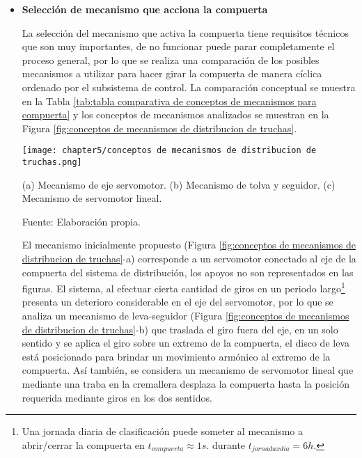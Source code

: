 \begin{itemize}
	
	\item \textbf{Selección de mecanismo que acciona la compuerta}
	
	La selección del mecanismo que activa la compuerta tiene requisitos técnicos que son muy importantes, de no funcionar puede parar completamente el proceso general, por lo que se realiza una comparación de los posibles mecanismos a utilizar para hacer girar la compuerta de manera cíclica ordenado por el subsistema de control. La comparación conceptual se muestra en la Tabla \ref{tab:tabla comparativa de conceptos de mecanismos para compuerta} y los conceptos de mecanismos analizados se muestran en la Figura \ref{fig:conceptos de mecanismos de distribucion de truchas}.
	
	\begin{myfigure}[H]
		\footnotesize\centering
		\texttt{[image: chapter5/conceptos de mecanismos de distribucion de truchas.png]}
		\caption[Conceptos de mecanismos de distribución de truchas]{(a) Mecanismo de eje servomotor. (b) Mecanismo de tolva y seguidor. (c) Mecanismo de servomotor lineal.}
		\begin{myflushcenter}
			Fuente: Elaboración propia.
		\end{myflushcenter}
		\label{fig:conceptos de mecanismos de distribucion de truchas}
	\end{myfigure}
	
	El mecanismo inicialmente propuesto (Figura \ref{fig:conceptos de mecanismos de distribucion de truchas}-a) corresponde a un servomotor conectado al eje de la compuerta del sistema de distribución, los apoyos no son representados en las figuras. El sistema, al efectuar cierta cantidad de giros en un periodo largo\footnote{Una jornada diaria de clasificación puede someter al mecanismo a abrir/cerrar la compuerta en $t_{compuerta}\approx1 s.$ durante $t_{jornadaxdia}=6 h.$} presenta un deterioro considerable en el eje del servomotor, por lo que se analiza un mecanismo de leva-seguidor (Figura \ref{fig:conceptos de mecanismos de distribucion de truchas}-b) que traslada el giro fuera del eje, en un solo sentido y se aplica el giro sobre un extremo de la compuerta, el disco de leva está posicionado para brindar un movimiento armónico al extremo de la compuerta. Así también, se considera un mecanismo de servomotor lineal que mediante una traba en la cremallera desplaza la compuerta hasta la posición requerida mediante giros en los dos sentidos.
	

\end{itemize}
